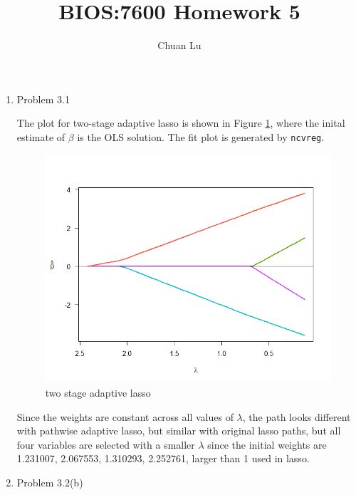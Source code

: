 \documentclass{article}
\begin{document}
\author{Chuan Lu}
\title{BIOS:7600 Homework 5}
\maketitle

\medskip

\begin{enumerate}

\item Problem 3.1

The plot for two-stage adaptive lasso is shown in Figure \ref{3.1}, where the inital estimate of $\beta$ is the OLS solution. The fit plot is generated by \texttt{ncvreg}.

\begin{figure}[h]
\centering
\includegraphics[scale=0.5]{two_stage_lasso.png}
\caption{two stage adaptive lasso}
\label{3.1}
\end{figure}

Since the weights are constant across all values of $\lambda$, the path looks different with pathwise adaptive lasso, but similar with original lasso paths, but all four variables are selected with a smaller $\lambda$ since the initial weights are 1.231007,  2.067553, 1.310293, 2.252761, larger than 1 used in lasso.

\item Problem 3.2(b)


\end{enumerate}
\end{document}
